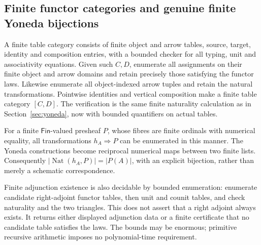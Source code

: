 \subsection{Finite functor categories and genuine finite Yoneda bijections}
A finite table category consists of finite object and arrow tables,
source, target, identity and composition entries, with a bounded checker
for all typing, unit and associativity equations. Given such $C,D$,
enumerate all assignments on their finite object and arrow domains and
retain precisely those satisfying the functor laws. Likewise enumerate
all object-indexed arrow tuples and retain the natural transformations.
Pointwise identities and vertical composition make a finite table category
$[C,D]$. The verification is the same finite naturality calculation as
in Section~\ref{sec:yoneda}, now with bounded quantifiers on actual tables.

For a finite $\mathsf{Fin}$-valued presheaf $P$, whose fibres are
finite ordinals with numerical equality, all transformations
$h_A\Rightarrow P$ can be enumerated in this manner. The Yoneda
constructions become reciprocal numerical maps between two finite lists.
Consequently $|\operatorname{Nat}(h_A,P)|=|P(A)|$, with an explicit
bijection, rather than merely a schematic correspondence.

Finite adjunction existence is also decidable by bounded enumeration:
enumerate candidate right-adjoint functor tables, then unit and counit
tables, and check naturality and the two triangles. This does not assert
that a right adjoint always exists. It returns either displayed adjunction
data or a finite certificate that no candidate table satisfies the laws.
The bounds may be enormous; primitive recursive arithmetic imposes no
polynomial-time requirement.
